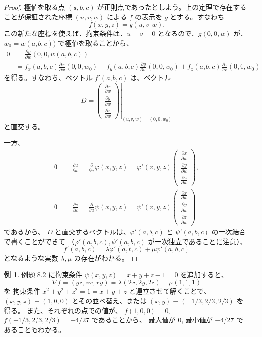 \documentclass[a4paper]{jsarticle}
\theoremstyle{definition}
\newtheorem{Example}[Theorem]{例}
\theoremstyle{remark}
\begin{document}
\begin{proof}
極値を取る点 $(a,b,c)$ が正則点であったとしよう。上の定理で存在することが保証された座標 $(u,v,w)$ による 
$f$ の表示を $g$ とする。すなわち
\[ 
f(x,y,z) = g(u,v,w). 
\]
この新たな座標を使えば、拘束条件は、$u = v = 0$ となるので、$g(0,0,w)$ が、
$w_0 = w(a,b,c))$ で極値を取ることから、
\begin{align*}
0 &= \frac{\partial g}{\partial w}(0,0,w(a,b,c))\\  
&= 
f_x(a,b,c) \frac{\partial x}{\partial w}(0,0,w_0) 
+ f_y(a,b,c) \frac{\partial y}{\partial w}(0,0,w_0) 
+ f_z(a,b,c) \frac{\partial z}{\partial w}(0,0,w_0) 
\end{align*}
を得る。すなわち、ベクトル $f'(a,b,c)$ は、ベクトル
\[ 
D = 
\left.
\begin{pmatrix}
\frac{\partial x}{\partial w}\\
\frac{\partial y}{\partial w}\\
\frac{\partial z}{\partial w}
\end{pmatrix}
\right|_{(u,v,w) = (0,0,w_0)}
\]
と直交する。

一方、
\begin{align*}
0 &= \frac{\partial u}{\partial w} = \frac{\partial}{\partial w} \varphi(x,y,z)
= \varphi'(x,y,z) 
\begin{pmatrix}
\frac{\partial x}{\partial w}\\
\frac{\partial y}{\partial w}\\
\frac{\partial z}{\partial w}
\end{pmatrix},\\ 
0 &= \frac{\partial v}{\partial w} = \frac{\partial}{\partial w} \psi(x,y,z)
= \psi'(x,y,z) 
\begin{pmatrix}
\frac{\partial x}{\partial w}\\
\frac{\partial y}{\partial w}\\
\frac{\partial z}{\partial w}
\end{pmatrix}
\end{align*}
であるから、
$D$ と直交するベクトルは、$\varphi'(a,b,c)$ と $\psi'(a,b,c)$ の一次結合で書くことができて
（$\varphi'(a,b,c), \psi'(a,b,c)$ が一次独立であることに注意）、
\[ 
f'(a,b,c) = \lambda \varphi'(a,b,c) + \mu \psi'(a,b,c) 
\]
となるような実数 $\lambda, \mu$ の存在がわかる。
\end{proof} 

\begin{Example}
例題 8.2 に拘束条件 $\psi(x,y,z) = x + y + z - 1 = 0$ を追加すると、
\[ 
\nabla f = (yz,zx,xy) = \lambda(2x,2y,2z) + \mu(1,1,1) 
\]
を
拘束条件 $x^2 + y^2 + z^2 = 1 = x + y + z$ と連立させて解くことで、
$(x,y,z) = (1,0,0)$ とその並べ替え、または $(x,y) = (-1/3, 2/3,2/3)$ を得る。
また、それぞれの点での値が、
$f(1,0,0) = 0$, $f(-1/3,2/3,2/3) = -4/27$ であることから、
最大値が $0$, 最小値が $-4/27$ であることもわかる。
\end{Example} 
\end{document}
